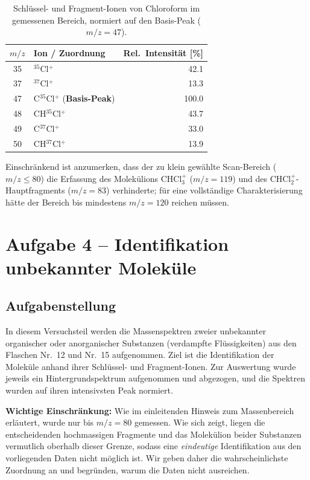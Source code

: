 \documentclass{article}
\begin{document}
\begin{table}[htbp]
    \centering
    \caption{Schlüssel- und Fragment-Ionen von Chloroform im gemessenen
        Bereich, normiert auf den Basis-Peak ($m/z = 47$).}
    \label{tab:chloroform}
    \begin{tabular}{c l r}
        \toprule
        $m/z$ & Ion / Zuordnung & Rel.\ Intensität [\%] \\
        \midrule
        35 & $^{35}$Cl$^+$                              &  42.1 \\
        37 & $^{37}$Cl$^+$                              &  13.3 \\
        47 & C$^{35}$Cl$^+$ (\textbf{Basis-Peak})       & 100.0 \\
        48 & CH$^{35}$Cl$^+$                            &  43.7 \\
        49 & C$^{37}$Cl$^+$                             &  33.0 \\
        50 & CH$^{37}$Cl$^+$                            &  13.9 \\
        \bottomrule
    \end{tabular}
\end{table}

Einschränkend ist anzumerken, dass der zu klein gewählte Scan-Bereich
($m/z \leq 80$) die Erfassung des Molekülions CHCl$_3^+$ ($m/z = 119$)
und des CHCl$_2^+$-Hauptfragments ($m/z = 83$) verhinderte; für eine
vollständige Charakterisierung hätte der Bereich bis mindestens
$m/z = 120$ reichen müssen.


\section{Aufgabe 4 -- Identifikation unbekannter Moleküle}
\label{sec:unbekannt}

\subsection*{Aufgabenstellung}

In diesem Versuchsteil werden die Massenspektren zweier unbekannter
organischer oder anorganischer Substanzen (verdampfte Flüssigkeiten)
aus den Flaschen Nr.~12 und Nr.~15 aufgenommen.
Ziel ist die Identifikation der Moleküle anhand ihrer Schlüssel- und
Fragment-Ionen.
Zur Auswertung wurde jeweils ein Hintergrundspektrum aufgenommen und
abgezogen, und die Spektren wurden auf ihren intensivsten Peak normiert.

\textbf{Wichtige Einschränkung:} Wie im einleitenden Hinweis zum
Massenbereich erläutert, wurde nur bis $m/z = 80$ gemessen.
Wie sich zeigt, liegen die entscheidenden hochmassigen Fragmente und
das Molekülion beider Substanzen vermutlich oberhalb dieser Grenze,
sodass eine \emph{eindeutige} Identifikation aus den vorliegenden Daten
nicht möglich ist. Wir geben daher die wahrscheinlichste Zuordnung an
und begründen, warum die Daten nicht ausreichen.
\end{document}
